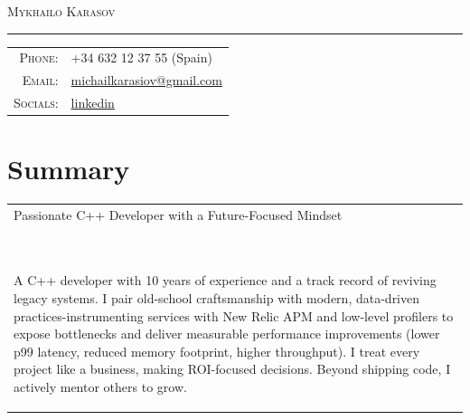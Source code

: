 \documentclass[a4paper,11pt]{article}
\begin{document}
\par{\centering
		{\Huge \textsc{Mykhailo Karasov}
	}\bigskip\par}

\hrule
\vspace{0.5em}
\begin{tabular}{rl}
  \textsc{Phone:}     & +34 632 12 37 55 (Spain)\\
  \textsc{Email:}     & \href{mailto:michailkarasiov@gmail.com}{michailkarasiov@gmail.com}\\
  \textsc{Socials:}   & \faLinkedin{} \href{https://www.linkedin.com/in/michael-karasov-2731465a/}{linkedin}
\end{tabular}

\section{Summary}
\begin{tabular}{p{}}
Passionate C++ Developer with a Future-Focused Mindset\\\

A C++ developer with 10 years of experience and a track record of reviving legacy systems. I pair old-school craftsmanship with modern, data-driven practices-instrumenting services with New Relic APM and low-level profilers to expose bottlenecks and deliver measurable performance improvements (lower p99 latency, reduced memory footprint, higher throughput). I treat every project like a business, making ROI-focused decisions. Beyond shipping code, I actively mentor others to grow.
\end{tabular}
\end{document}
